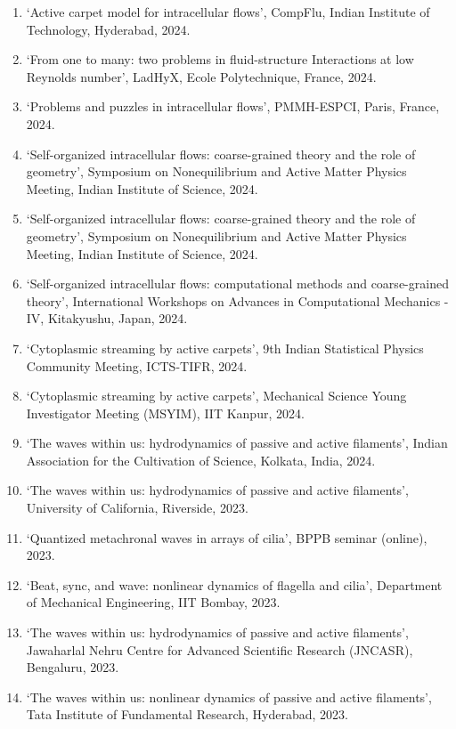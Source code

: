 \documentclass[10pt]{res} %
\begin{document}
\begin{resume}
\begin{enumerate}
	\vspace*{5mm}
	\item `Active carpet model for intracellular flows', CompFlu, Indian Institute of Technology, Hyderabad, 2024.
	\item `From one to many: two problems in fluid-structure Interactions at low Reynolds number', LadHyX, Ecole Polytechnique, France, 2024. 
	\item `Problems and puzzles in intracellular flows', PMMH-ESPCI, Paris, France, 2024.
	\item `Self-organized intracellular flows: coarse-grained theory and the role of geometry', Symposium on Nonequilibrium and Active Matter Physics Meeting, Indian Institute of Science, 2024.
	\item `Self-organized intracellular flows: coarse-grained theory and the role of geometry', Symposium on Nonequilibrium and Active Matter Physics Meeting, Indian Institute of Science, 2024.
	\item `Self-organized intracellular flows: computational methods and coarse-grained theory', International Workshops on Advances in Computational Mechanics - IV, Kitakyushu, Japan, 2024.
	\item `Cytoplasmic streaming by active carpets', 9th Indian Statistical Physics Community Meeting, ICTS-TIFR, 2024.
	\item `Cytoplasmic streaming by active carpets', Mechanical Science Young Investigator Meeting (MSYIM), IIT Kanpur, 2024.
	\item `The waves within us: hydrodynamics of passive and active filaments', Indian Association for the Cultivation of Science, Kolkata, India, 2024.
	\item `The waves within us: hydrodynamics of passive and active filaments', University of California, Riverside, 2023.
	\item `Quantized metachronal waves in arrays of cilia', BPPB seminar (online), 2023.
	\item `Beat, sync, and wave: nonlinear dynamics of flagella and cilia', Department of Mechanical Engineering, IIT Bombay, 2023.
	\item `The waves within us: hydrodynamics of passive and active filaments', Jawaharlal Nehru Centre for Advanced Scientific Research (JNCASR), Bengaluru, 2023.
	\item `The waves within us: nonlinear dynamics of passive and active filaments', Tata Institute of Fundamental Research, Hyderabad, 2023.

\end{enumerate}
\end{resume}
\end{document}
